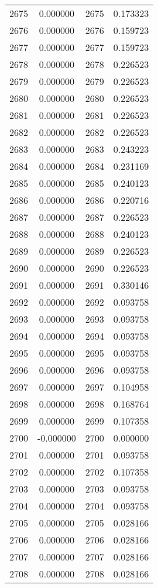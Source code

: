\documentclass[12pt]{article}
\begin{document}
\begin{longtable}{@{}cccc@{}}
2675 & 0.000000 & 2675 & 0.173323 \\
2676 & 0.000000 & 2676 & 0.159723 \\
2677 & 0.000000 & 2677 & 0.159723 \\
2678 & 0.000000 & 2678 & 0.226523 \\
2679 & 0.000000 & 2679 & 0.226523 \\
2680 & 0.000000 & 2680 & 0.226523 \\
2681 & 0.000000 & 2681 & 0.226523 \\
2682 & 0.000000 & 2682 & 0.226523 \\
2683 & 0.000000 & 2683 & 0.243223 \\
2684 & 0.000000 & 2684 & 0.231169 \\
2685 & 0.000000 & 2685 & 0.240123 \\
2686 & 0.000000 & 2686 & 0.220716 \\
2687 & 0.000000 & 2687 & 0.226523 \\
2688 & 0.000000 & 2688 & 0.240123 \\
2689 & 0.000000 & 2689 & 0.226523 \\
2690 & 0.000000 & 2690 & 0.226523 \\
2691 & 0.000000 & 2691 & 0.330146 \\
2692 & 0.000000 & 2692 & 0.093758 \\
2693 & 0.000000 & 2693 & 0.093758 \\
2694 & 0.000000 & 2694 & 0.093758 \\
2695 & 0.000000 & 2695 & 0.093758 \\
2696 & 0.000000 & 2696 & 0.093758 \\
2697 & 0.000000 & 2697 & 0.104958 \\
2698 & 0.000000 & 2698 & 0.168764 \\
2699 & 0.000000 & 2699 & 0.107358 \\
2700 & -0.000000 & 2700 & 0.000000 \\
2701 & 0.000000 & 2701 & 0.093758 \\
2702 & 0.000000 & 2702 & 0.107358 \\
2703 & 0.000000 & 2703 & 0.093758 \\
2704 & 0.000000 & 2704 & 0.093758 \\
2705 & 0.000000 & 2705 & 0.028166 \\
2706 & 0.000000 & 2706 & 0.028166 \\
2707 & 0.000000 & 2707 & 0.028166 \\
2708 & 0.000000 & 2708 & 0.028166 \\

\end{longtable}
\end{document}
